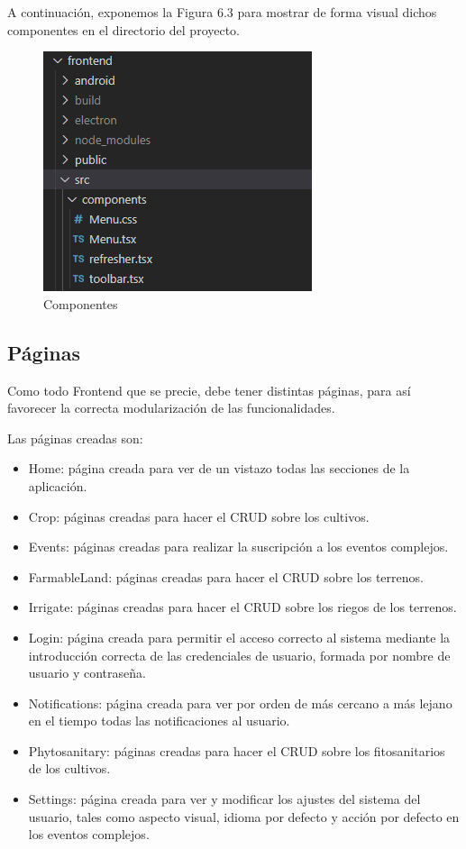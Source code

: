 A continuación, exponemos la Figura 6.3 para mostrar de forma visual dichos componentes en el directorio del proyecto.

\begin{figure}[H]
    \centering
    \includegraphics[width=0.7\linewidth]{images/implementation/frontend/frontend components.png}
    \caption{Componentes}
\end{figure}

\subsection{Páginas}
Como todo Frontend que se precie, debe tener distintas páginas, para así favorecer la correcta modularización de las funcionalidades.

Las páginas creadas son:
\begin{itemize}
    \item Home: página creada para ver de un vistazo todas las secciones de la aplicación.
    \item Crop: páginas creadas para hacer el CRUD sobre los cultivos.
    \item Events: páginas creadas para realizar la suscripción a los eventos complejos.
    \item FarmableLand: páginas creadas para hacer el CRUD sobre los terrenos.
    \item Irrigate: páginas creadas para hacer el CRUD sobre los riegos de los terrenos.
    \item Login: página creada para permitir el acceso correcto al sistema mediante la introducción correcta de las credenciales de usuario, formada por nombre de usuario y contraseña.
    \item Notifications: página creada para ver por orden de más cercano a más lejano en el tiempo todas las notificaciones al usuario.
    \item Phytosanitary: páginas creadas para hacer el CRUD sobre los fitosanitarios de los cultivos.
    \item Settings: página creada para ver y modificar los ajustes del sistema del usuario, tales como aspecto visual, idioma por defecto y acción por defecto en los eventos complejos.
\end{itemize}

